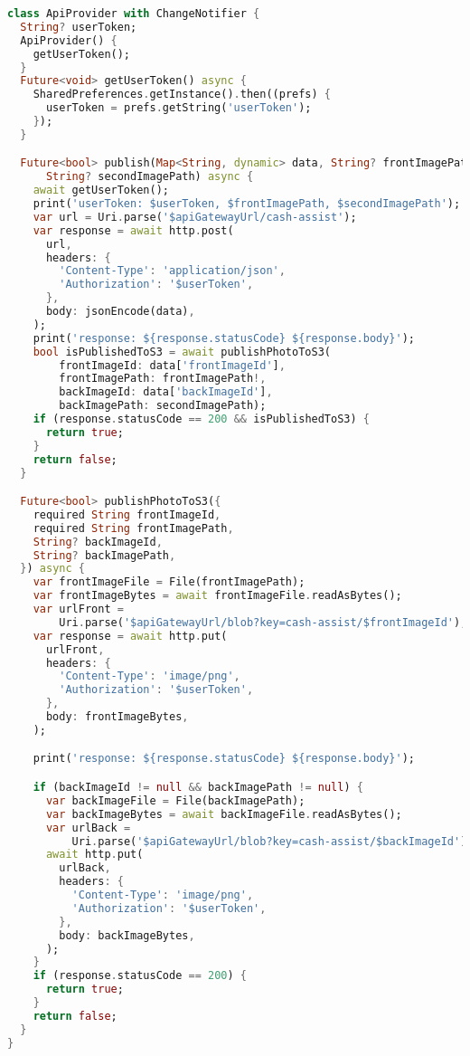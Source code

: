 \begin{lstlisting}[language=Dart, caption=Бакендийн хэрэгжүүлэлт, frame=single]
class ApiProvider with ChangeNotifier {
  String? userToken;
  ApiProvider() {
    getUserToken();
  }
  Future<void> getUserToken() async {
    SharedPreferences.getInstance().then((prefs) {
      userToken = prefs.getString('userToken');
    });
  }

  Future<bool> publish(Map<String, dynamic> data, String? frontImagePath,
      String? secondImagePath) async {
    await getUserToken();
    print('userToken: $userToken, $frontImagePath, $secondImagePath');
    var url = Uri.parse('$apiGatewayUrl/cash-assist');
    var response = await http.post(
      url,
      headers: {
        'Content-Type': 'application/json',
        'Authorization': '$userToken',
      },
      body: jsonEncode(data),
    );
    print('response: ${response.statusCode} ${response.body}');
    bool isPublishedToS3 = await publishPhotoToS3(
        frontImageId: data['frontImageId'],
        frontImagePath: frontImagePath!,
        backImageId: data['backImageId'],
        backImagePath: secondImagePath);
    if (response.statusCode == 200 && isPublishedToS3) {
      return true;
    }
    return false;
  }

  Future<bool> publishPhotoToS3({
    required String frontImageId,
    required String frontImagePath,
    String? backImageId,
    String? backImagePath,
  }) async {
    var frontImageFile = File(frontImagePath);
    var frontImageBytes = await frontImageFile.readAsBytes();
    var urlFront =
        Uri.parse('$apiGatewayUrl/blob?key=cash-assist/$frontImageId');
    var response = await http.put(
      urlFront,
      headers: {
        'Content-Type': 'image/png',
        'Authorization': '$userToken',
      },
      body: frontImageBytes,
    );

    print('response: ${response.statusCode} ${response.body}');

    if (backImageId != null && backImagePath != null) {
      var backImageFile = File(backImagePath);
      var backImageBytes = await backImageFile.readAsBytes();
      var urlBack =
          Uri.parse('$apiGatewayUrl/blob?key=cash-assist/$backImageId');
      await http.put(
        urlBack,
        headers: {
          'Content-Type': 'image/png',
          'Authorization': '$userToken',
        },
        body: backImageBytes,
      );
    }
    if (response.statusCode == 200) {
      return true;
    }
    return false;
  }
}

\end{lstlisting}